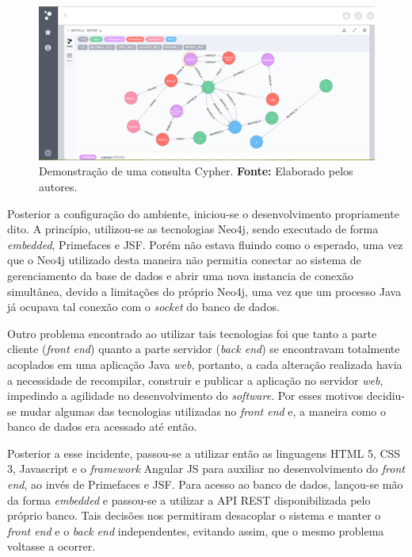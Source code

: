 \begin{figure}[h!]
	\centerline{\includegraphics[scale=0.4]{./imagens/neo4j2.jpg}}
	\caption[Demonstração de uma consulta Cypher.]
	{Demonstração de uma consulta Cypher. \textbf{Fonte:} Elaborado pelos autores.}
	\label{fig:exemplo1}
\end{figure}
 
\newpage

\par Posterior a configuração do ambiente, iniciou-se o desenvolvimento propriamente dito. A princípio, utilizou-se as tecnologias Neo4j, sendo executado de forma \textit{embedded}, Primefaces e JSF. Porém não estava fluindo como o esperado, uma vez que o Neo4j utilizado desta maneira não permitia conectar ao sistema de gerenciamento da base de dados e abrir uma nova instancia de conexão simultânea, devido a limitações do próprio Neo4j, uma vez que um processo Java já ocupava tal conexão com o \textit{socket} do banco de dados.

\par Outro problema encontrado ao utilizar tais tecnologias foi que tanto a parte cliente (\textit{front end}) quanto a parte servidor (\textit{back end}) se encontravam totalmente acoplados em uma aplicação Java \textit{web}, portanto, a cada alteração realizada havia a necessidade de recompilar, construir e publicar a aplicação no servidor \textit{web}, impedindo a agilidade no desenvolvimento do \textit{software}. Por esses motivos decidiu-se mudar algumas das tecnologias utilizadas no \textit{front end} e, a maneira como o banco de dados era acessado até então. 

\par Posterior a esse incidente, passou-se a utilizar então as linguagens HTML 5, CSS 3, Javascript e o \textit{framework} Angular JS para auxiliar no desenvolvimento do \textit{front end}, ao invés de Primefaces e JSF. Para acesso ao banco de dados, lançou-se mão da forma \textit{embedded} e passou-se a utilizar a API REST disponibilizada pelo próprio banco. Tais decisões nos permitiram desacoplar o sistema e manter o \textit{front end} e o \textit{back end} independentes, evitando assim, que o mesmo problema voltasse a ocorrer.

